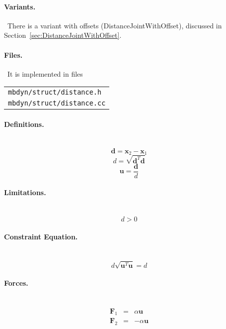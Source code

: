 \documentclass[10pt,dvips,fleqn,subeqn]{report}
\newcommand{\T}[1]{\boldsymbol{#1}}
\begin{document}
\paragraph{Variants.} \
There is a variant with offsets (DistanceJointWithOffset),
discussed in Section~\ref{sec:DistanceJointWithOffset}.

\paragraph{Files.} \
It is implemented in files

\begin{tabular}{l}
\texttt{mbdyn/struct/distance.h} \\
\texttt{mbdyn/struct/distance.cc}
\end{tabular}

\paragraph{Definitions.} \
\begin{equation}
	\T{d} = \T{x}_2 - \T{x}_1
\end{equation}
\begin{equation}
	d = \sqrt{\T{d}^T \T{d}}
\end{equation}
\begin{equation}
	\T{u} = \frac{\T{d}}{d}
\end{equation}

\paragraph{Limitations.} \
\begin{equation}
	d > 0
\end{equation}

\paragraph{Constraint Equation.} \
\begin{equation}
	d \sqrt{\T{u}^T \T{u}} = d
\end{equation}

\paragraph{Forces.} \
\begin{eqnarray}
	\T{F}_1 & = & \alpha \T{u} \\
	\T{F}_2 & = & -\alpha \T{u}
\end{eqnarray}
\end{document}
